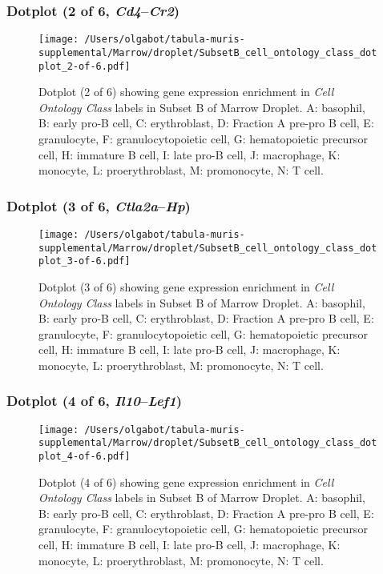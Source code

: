 \clearpage

\subsubsection{Dotplot (2 of 6, \emph{Cd4}--\emph{Cr2})}
\begin{figure}[h]
\centering
\texttt{[image: /Users/olgabot/tabula-muris-supplemental/Marrow/droplet/SubsetB\_cell\_ontology\_class\_dotplot\_2-of-6.pdf]}

\caption{ Dotplot (2 of 6)  showing gene expression enrichment in \emph{Cell Ontology Class} labels in Subset B of Marrow Droplet. A: basophil, B: early pro-B cell, C: erythroblast, D: Fraction A pre-pro B cell, E: granulocyte, F: granulocytopoietic cell, G: hematopoietic precursor cell, H: immature B cell, I: late pro-B cell, J: macrophage, K: monocyte, L: proerythroblast, M: promonocyte, N: T cell.}
\end{figure}


\clearpage

\subsubsection{Dotplot (3 of 6, \emph{Ctla2a}--\emph{Hp})}
\begin{figure}[h]
\centering
\texttt{[image: /Users/olgabot/tabula-muris-supplemental/Marrow/droplet/SubsetB\_cell\_ontology\_class\_dotplot\_3-of-6.pdf]}

\caption{ Dotplot (3 of 6)  showing gene expression enrichment in \emph{Cell Ontology Class} labels in Subset B of Marrow Droplet. A: basophil, B: early pro-B cell, C: erythroblast, D: Fraction A pre-pro B cell, E: granulocyte, F: granulocytopoietic cell, G: hematopoietic precursor cell, H: immature B cell, I: late pro-B cell, J: macrophage, K: monocyte, L: proerythroblast, M: promonocyte, N: T cell.}
\end{figure}


\clearpage

\subsubsection{Dotplot (4 of 6, \emph{Il10}--\emph{Lef1})}
\begin{figure}[h]
\centering
\texttt{[image: /Users/olgabot/tabula-muris-supplemental/Marrow/droplet/SubsetB\_cell\_ontology\_class\_dotplot\_4-of-6.pdf]}

\caption{ Dotplot (4 of 6)  showing gene expression enrichment in \emph{Cell Ontology Class} labels in Subset B of Marrow Droplet. A: basophil, B: early pro-B cell, C: erythroblast, D: Fraction A pre-pro B cell, E: granulocyte, F: granulocytopoietic cell, G: hematopoietic precursor cell, H: immature B cell, I: late pro-B cell, J: macrophage, K: monocyte, L: proerythroblast, M: promonocyte, N: T cell.}
\end{figure}


